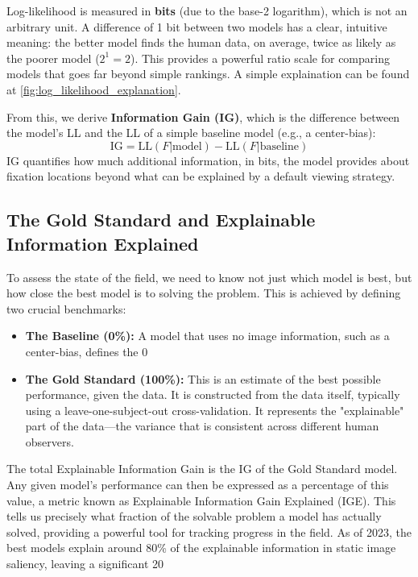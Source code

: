 Log-likelihood is measured in \textbf{bits} (due to the base-2 logarithm), which is not an arbitrary unit. A difference of 1 bit between two models has a clear, intuitive meaning: the better model finds the human data, on average, twice as likely as the poorer model ($2^1 = 2$). This provides a powerful ratio scale for comparing models that goes far beyond simple rankings.
A simple explaination can be found at \cref{fig:log_likelihood_explanation}.

From this, we derive \textbf{Information Gain (IG)}, which is the difference between the model's LL and the LL of a simple baseline model (e.g., a center-bias):
\begin{equation}
\text{IG} = \text{LL}(F | \text{model}) - \text{LL}(F | \text{baseline})
\label{eq:information_gain}
\end{equation}
IG quantifies how much additional information, in bits, the model provides about fixation locations beyond what can be explained by a default viewing strategy.



\subsection{The Gold Standard and Explainable Information Explained}
To assess the state of the field, we need to know not just which model is best, but how close the best model is to solving the problem. This is achieved by defining two crucial benchmarks:
\begin{itemize}
\item \textbf{The Baseline (0\%):} A model that uses no image information, such as a center-bias, defines the 0%
\item \textbf{The Gold Standard (100\%):} This is an estimate of the best possible performance, given the data. It is constructed from the data itself, typically using a leave-one-subject-out cross-validation. It represents the "explainable" part of the data—the variance that is consistent across different human observers.
\end{itemize}
The total Explainable Information Gain is the IG of the Gold Standard model. Any given model's performance can then be expressed as a percentage of this value, a metric known as Explainable Information Gain Explained (IGE). This tells us precisely what fraction of the solvable problem a model has actually solved, providing a powerful tool for tracking progress in the field. As of 2023, the best models explain around 80\% of the explainable information in static image saliency, leaving a significant 20%


